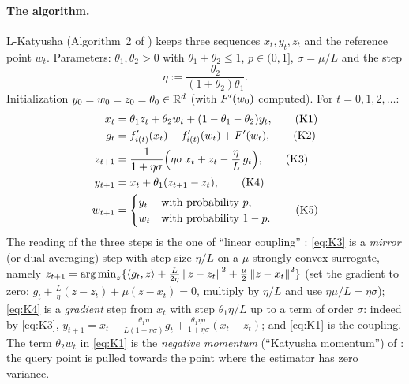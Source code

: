 \paragraph{The algorithm.} L-Katyusha (Algorithm~2 of \cite{kovalev2020dont}) keeps three sequences $x_t,y_t,z_t$ and the reference point $w_t$. Parameters: $\theta_1,\theta_2>0$ with $\theta_1+\theta_2\le1$, $p\in(0,1]$, $\sigma=\mu/L$ and the step
\begin{equation}\label{eq:lk-eta}
\eta := \frac{\theta_2}{(1+\theta_2)\theta_1}.
\end{equation}
Initialization $y_0=w_0=z_0=\theta_0\in\mathbb{R}^d$ (with $F'(w_0)$ computed). For $t=0,1,2,\dots$:
\begin{align}
x_t &= \theta_1 z_t+\theta_2 w_t+(1-\theta_1-\theta_2)y_t, \tag{K1}\label{eq:K1}\\
g_t &= f'_{i(t)}(x_t)-f'_{i(t)}(w_t)+F'(w_t), \tag{K2}\label{eq:K2}\\
z_{t+1} &= \frac1{1+\eta\sigma}\Big(\eta\sigma\,x_t+z_t-\frac\eta L\,g_t\Big), \tag{K3}\label{eq:K3}\\
y_{t+1} &= x_t+\theta_1(z_{t+1}-z_t), \tag{K4}\label{eq:K4}\\
w_{t+1} &= \begin{cases} y_t & \text{with probability } p,\\ w_t & \text{with probability } 1-p.\end{cases} \tag{K5}\label{eq:K5}
\end{align}
The reading of the three steps is the one of ``linear coupling'' \cite{allenzhu2017linear}: \eqref{eq:K3} is a \emph{mirror} (or dual-averaging) step with step size $\eta/L$ on a $\mu$-strongly convex surrogate, namely $z_{t+1}=\operatorname*{arg\,min}_z\{\left\langle g_t, z \right\rangle+\frac L{2\eta}\left\|z-z_t\right\|^2+\frac\mu2\left\|z-x_t\right\|^2\}$ (set the gradient to zero: $g_t+\frac L\eta(z-z_t)+\mu(z-x_t)=0$, multiply by $\eta/L$ and use $\eta\mu/L=\eta\sigma$); \eqref{eq:K4} is a \emph{gradient} step from $x_t$ with step $\theta_1\eta/L$ up to a term of order $\sigma$: indeed by \eqref{eq:K3}, $y_{t+1}=x_t-\frac{\theta_1\eta}{L(1+\eta\sigma)}g_t+\frac{\theta_1\eta\sigma}{1+\eta\sigma}(x_t-z_t)$; and \eqref{eq:K1} is the coupling. The term $\theta_2 w_t$ in \eqref{eq:K1} is the \emph{negative momentum} (``Katyusha momentum'') of \cite{allenzhu2018katyusha}: the query point is pulled towards the point where the estimator has zero variance.


